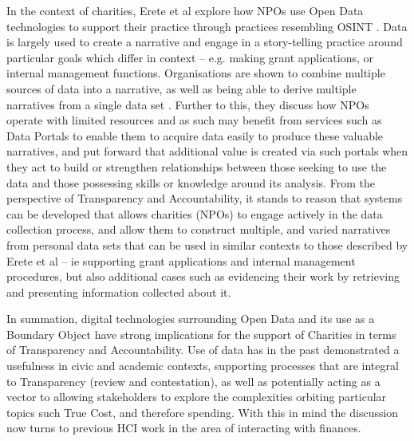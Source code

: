 In the context of charities, Erete et al explore how NPOs use Open Data technologies to support their practice through practices resembling OSINT \cite{erete_storytelling_2016}. Data is largely used to create a narrative and engage in a story-telling practice around particular goals which differ in context -- e.g. making grant applications, or internal management functions. Organisations are shown to combine multiple sources of data into a narrative, as well as being able to derive multiple narratives from a single data set \cite{erete_storytelling_2016}. Further to this, they discuss how NPOs operate with limited resources and as such may benefit from services such as Data Portals to enable them to acquire data easily to produce these valuable narratives, and put forward that additional value is created via such portals when they act to build or strengthen relationships between those seeking to use the data and those possessing skills or knowledge around its analysis. From the perspective of Transparency and Accountability, it stands to reason that systems can be developed that allows charities (NPOs) to engage actively in the data collection process, and allow them to construct multiple, and varied narratives from personal data sets that can be used in similar contexts to those described by Erete et al -- ie supporting grant applications and internal management procedures, but also additional cases such as evidencing their work by retrieving and presenting information collected about it.

In summation, digital technologies surrounding Open Data and its use as a Boundary Object have strong implications for the support of Charities in terms of Transparency and Accountability. Use of data has in the past demonstrated a usefulness in civic and academic contexts, supporting processes that are integral to Transparency (review and contestation), as well as potentially acting as a vector to allowing stakeholders to explore the complexities orbiting particular topics such True Cost, and therefore spending. With this in mind the discussion now turns to previous HCI work in the area of interacting with finances.


